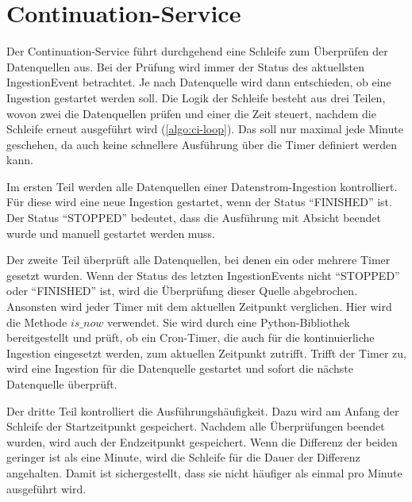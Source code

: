 \section{Continuation-Service}

Der Continuation-Service führt durchgehend eine Schleife zum Überprüfen der Datenquellen aus.
Bei der Prüfung wird immer der Status des aktuellsten IngestionEvent betrachtet.
Je nach Datenquelle wird dann entschieden, ob eine Ingestion gestartet werden soll.
Die Logik der Schleife besteht aus drei Teilen, wovon zwei die Datenquellen prüfen und einer die Zeit steuert, nachdem die Schleife erneut ausgeführt wird (\cref{algo:ci-loop}).
Das soll nur maximal jede Minute geschehen, da auch keine schnellere Ausführung über die Timer definiert werden kann.

Im ersten Teil werden alle Datenquellen einer Datenstrom-Ingestion kontrolliert.
Für diese wird eine neue Ingestion gestartet, wenn der Status "`FINISHED"' ist.
Der Status "`STOPPED"' bedeutet, dass die Ausführung mit Absicht beendet wurde und manuell gestartet werden muss.

Der zweite Teil überprüft alle Datenquellen, bei denen ein oder mehrere Timer gesetzt wurden.
Wenn der Status des letzten IngestionEvents nicht "`STOPPED"' oder "`FINISHED"' ist, wird die Überprüfung dieser Quelle abgebrochen.
Ansonsten wird jeder Timer mit dem aktuellen Zeitpunkt verglichen.
Hier wird die Methode $is\_now$ verwendet.
Sie wird durch eine Python-Bibliothek bereitgestellt und prüft, ob ein Cron-Timer, die auch für die kontinuierliche Ingestion eingesetzt werden, zum aktuellen Zeitpunkt zutrifft.
Trifft der Timer zu, wird eine Ingestion für die Datenquelle gestartet und sofort die nächste Datenquelle überprüft.

Der dritte Teil kontrolliert die Ausführungshäufigkeit.
Dazu wird am Anfang der Schleife der Startzeitpunkt gespeichert.
Nachdem alle Überprüfungen beendet wurden, wird auch der Endzeitpunkt gespeichert.
Wenn die Differenz der beiden geringer ist als eine Minute, wird die Schleife für die Dauer der Differenz angehalten.
Damit ist sichergestellt, dass sie nicht häufiger als einmal pro Minute ausgeführt wird.

